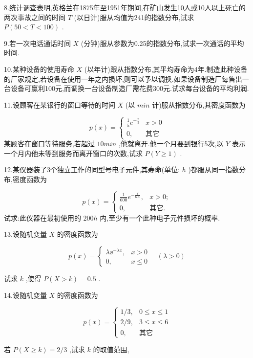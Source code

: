 8.统计调查表明,英格兰在1875年至1951年期间,在矿山发生10人或10人以上死亡的两次事故之间的时间 $ T $ (以日计)服从均值为241的指数分布,试求 $ P(50<T<100) $ .

9.若一次电话通话时间 $ X $ (分钟)服从参数为0.25的指数分布,试求一次通话的平均时间.

10.某种设备的使用寿命 $ X $ (以年计)跟从指数分布,其平均寿命为4年.制造此种设备的厂家规定,若设备在使用一年之内损坏,则可以予以调换.如果设备制造厂每售出一台设备可赢利100元,而调换一台设备制造厂需花费300元.试求每台设备的平均利润.

11.设顾客在某银行的窗口等待的时间 $ X $ (以 $ min $ 计)服从指数分布,其密度函数为

\[
p(x)=\left\{
\begin{array}{ll}
{\frac{1}{5} e^{-\frac{x}{5}}} & {x>0} \\ 
{0,}  &  {\text{其它}}
\end{array}\right.
\]
某顾客在窗口等待服务,若超过 $ 10min $ ,他就离开.他一个月要到银行5次,以 $ Y $ 表示一个月内他未等到服务而离开窗口的次数,试求 $ P(Y \geqslant 1) $ .

12.某仪器装了3个独立工作的同型号电子元件,其寿命(单位: $ h $ )都服从同一指数分布,密度函数为

\[
p(x)=\left\{\begin{array}{ll}
{\frac{1}{600} e^{-\frac{x}{600}},} & {x>0 ;} \\ 
{0,} & {\text{其它.}}
\end{array}\right.
\]
试求:此仪器在最初使用的 $ 200h $ 内,至少有一个此种电子元件损坏的概率.

13.设随机变量 $ X $ 的密度函数为

\[
p(x)=\left\{ \begin{array}{ll}
{\lambda \ee ^{-\lambda x},} & {x>0} \\ 
{0,} & {x \leqslant 0}
\end{array}\right. \quad(\lambda>0)
\]

试求 $ k $ ,使得 $ P(X>k)=0.5 $ .

14.设随机变量 $ X $ 的密度函数为

\[
p(x)=\left\{\begin{array}{ll}
{1 / 3,} & {0 \leqslant x \leqslant 1} \\ 
{2 / 9,} & {3 \leqslant x \leqslant 6} \\ 
{0,} & {\text{其它}}
\end{array}
\right.
\]

若 $ P(X \geqslant k)=2 / 3 $ ,试求 $ k $ 的取值范围,

